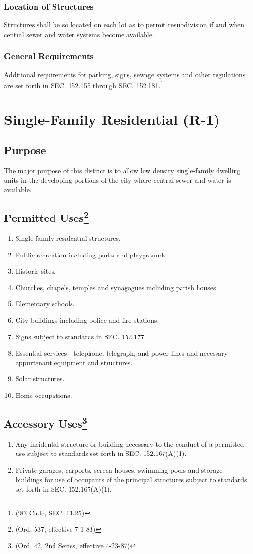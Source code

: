 \subsubsection{Location of Structures}
Structures shall be so located on each lot as to permit resubdivision if and when central sewer and water systems become available.
\subsubsection{General Requirements}
Additional requirements for parking, signs, sewage systems and other regulations are set forth in SEC. 152.155 through SEC. 152.181.\footnote{(‘83 Code, SEC. 11.25)}
\section{Single-Family Residential (R-1)}
\subsection{Purpose}
The major purpose of this district is to allow low density single-family dwelling units in the developing portions of the city where central sewer and water is available.
\subsection{Permitted Uses\footnote{(Ord. 537, effective 7-1-83)}}
\begin{enumerate}[{\indent}1)]
    \item Single-family residential structures.
    \item Public recreation including parks and playgrounds.
    \item Historic sites.
    \item Churches, chapels, temples and synagogues including parish houses.
    \item Elementary schools.
    \item City buildings including police and fire stations.
    \item Signs subject to standards in SEC. 152.177.
    \item Essential services - telephone, telegraph, and power lines and necessary appurtenant equipment and structures.
    \item Solar structures.
    \item Home occupations.
\end{enumerate}
\subsection{Accessory Uses\footnote{(Ord. 42, 2nd Series, effective  4-23-87)}}
\begin{enumerate}[{\indent}1)]
    \item Any incidental structure or building necessary to the conduct of a permitted use subject to standards set forth in SEC. 152.167(A)(1).
    \item Private garages, carports, screen houses, swimming pools and storage buildings for use of occupants of the principal structures subject to standards set forth in SEC. 152.167(A)(1).
\end{enumerate}
